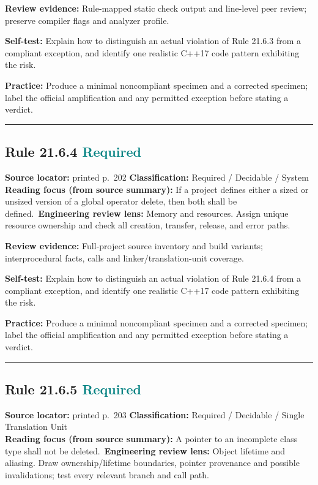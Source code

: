 \documentclass[10pt,letterpaper]{article}
\begin{document}
\textbf{Review evidence:} Rule-mapped static check output and line-level peer review; preserve compiler flags and analyzer profile.

\textbf{Self-test:} Explain how to distinguish an actual violation of Rule 21.6.3 from a compliant exception, and identify one realistic C++17 code pattern exhibiting the risk.\par
\textbf{Practice:} Produce a minimal noncompliant specimen and a corrected specimen; label the official amplification and any permitted exception before stating a verdict.
\smallskip\hrule\smallskip
\subsection*{Rule 21.6.4 \enspace \texorpdfstring{\small\textcolor{teal}{Required}}{Required}}
\noindent\textbf{Source locator:} printed p.~202 \quad\textbf{Classification:} Required / Decidable / System\\
\textbf{Reading focus (from source summary):} If a project defines either a sized or unsized version of a global operator delete, then both shall be defined.\
\textbf{Engineering review lens:} Memory and resources. Assign unique resource ownership and check all creation, transfer, release, and error paths.

\textbf{Review evidence:} Full-project source inventory and build variants; interprocedural facts, calls and linker/translation-unit coverage.

\textbf{Self-test:} Explain how to distinguish an actual violation of Rule 21.6.4 from a compliant exception, and identify one realistic C++17 code pattern exhibiting the risk.\par
\textbf{Practice:} Produce a minimal noncompliant specimen and a corrected specimen; label the official amplification and any permitted exception before stating a verdict.
\smallskip\hrule\smallskip
\subsection*{Rule 21.6.5 \enspace \texorpdfstring{\small\textcolor{teal}{Required}}{Required}}
\noindent\textbf{Source locator:} printed p.~203 \quad\textbf{Classification:} Required / Decidable / Single Translation Unit\\
\textbf{Reading focus (from source summary):} A pointer to an incomplete class type shall not be deleted.\
\textbf{Engineering review lens:} Object lifetime and aliasing. Draw ownership/lifetime boundaries, pointer provenance and possible invalidations; test every relevant branch and call path.
\end{document}
